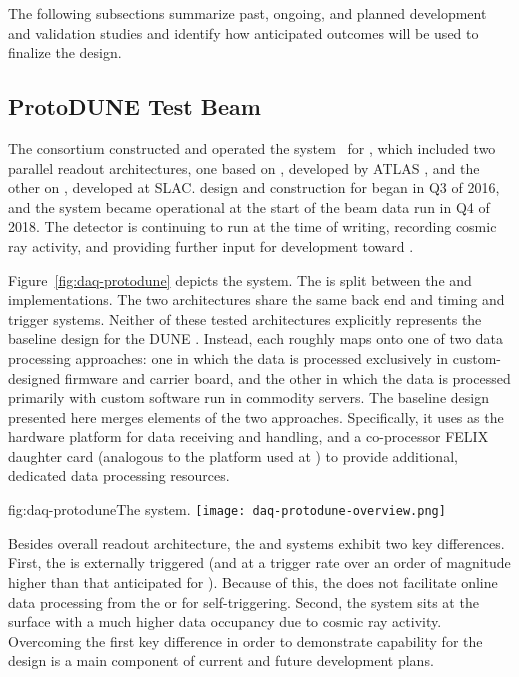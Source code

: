 The following subsections summarize past, ongoing, and planned
development and validation studies and identify how anticipated outcomes
will be used to finalize the  design.

\subsection{ProtoDUNE Test Beam}

\label{sec:fd-daq:protodune}

The   consortium constructed and operated the  system~\cite{Sipos:2018auh} for , which included two parallel  readout architectures, one based on , developed by ATLAS \cite{atlas-felix}, and the other on , developed at SLAC.  design and construction for  began in Q3 of 2016, and the system became operational at the start of the beam data run in Q4 of 2018. The detector is continuing to run at the time of writing, recording cosmic ray activity, and providing further input for  development toward . 

Figure~\ref{fig:daq-protodune} depicts the   system. 
The  is split between the  and 
\cite{bib:docdb1881} implementations. The two architectures share the
same back end and timing and trigger systems.  
Neither of these tested architectures explicitly represents the baseline design for the DUNE . Instead, each roughly maps onto one of two data processing approaches: one in which the data is processed exclusively in custom-designed  firmware and carrier board, and the other in which the data is processed primarily with custom software run in commodity servers. The baseline design presented here merges elements of the two approaches. Specifically, it uses  as the hardware platform for data receiving and handling, and a co-processor FELIX daughter card (analogous to the  platform used at ) to provide additional, dedicated data processing resources.


\begin{dunefigure}{fig:daq-protodune}{The   system.}
  \texttt{[image: daq-protodune-overview.png]}
\end{dunefigure}

Besides overall readout architecture, the  and   systems exhibit two key differences. 
First, the   is externally triggered (and at a trigger rate over an order of magnitude higher than that anticipated for ). Because of this, the   does not facilitate online data processing from the  or  for self-triggering. 
Second, the  system sits at the surface with a much higher data occupancy due to cosmic ray activity.
Overcoming the first key difference in order to demonstrate
 capability for the   design is a
main component of current and future  development plans.

